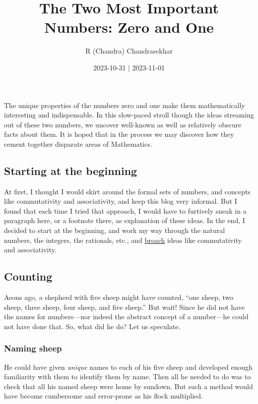 \documentclass[
  a4paper,
]{article}
\title{The Two Most Important Numbers: Zero and One}
\author{R (Chandra) Chandrasekhar}
\date{2023-10-31 | 2023-11-01}
\begin{document}
\maketitle

\thispagestyle{empty}


The unique properties of the numbers zero and one make them
mathematically interesting and indispensable. In this slow-paced stroll
though the ideas streaming out of these two numbers, we uncover
well-known as well as relatively obscure facts about them. It is hoped
that in the process we may discover how they cement together disparate
areas of Mathematics.

\hypertarget{starting-at-the-beginning}{%
\subsection{Starting at the beginning}\label{starting-at-the-beginning}}

At first, I thought I would skirt around the formal sets of numbers, and
concepts like commutativity and associativity, and keep this blog very
informal. But I found that each time I tried that approach, I would have
to furtively sneak in a paragraph here, or a footnote there, as
explanation of these ideas. In the end, I decided to start at the
beginning, and work my way through the natural numbers, the integers,
the rationals, etc., and
\href{https://www.thefreedictionary.com/broach}{broach} ideas like
commutativity and associativity.

\hypertarget{counting}{%
\subsection{Counting}\label{counting}}

Aeons ago, a shepherd with five sheep might have counted, ``one sheep,
two sheep, three sheep, four sheep, and five sheep.'' But wait! Since he
did not have the names for numbers---nor indeed the abstract concept of
a number---he could not have done that. So, what did he do? Let us
speculate.

\hypertarget{naming-sheep}{%
\subsubsection{Naming sheep}\label{naming-sheep}}

He could have given \emph{unique} names to each of his five sheep and
developed enough familiarity with them to identify them by name. Then
all he needed to do was to check that all his named sheep were home by
sundown. But such a method would have become cumbersome and error-prone
as his flock multiplied.
\end{document}
